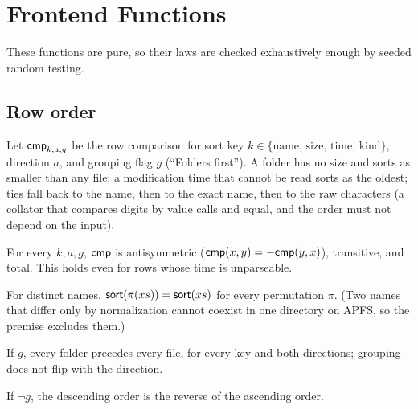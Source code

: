 \section{Frontend Functions}
\label{sec:frontend}

These functions are pure, so their laws are checked exhaustively enough by
seeded random testing.

\subsection{Row order}

Let $\mathsf{cmp}_{k,a,g}$ be the row comparison for sort key $k\in\{\text{name, size,
time, kind}\}$, direction $a$, and grouping flag $g$ (``Folders first'').  A
folder has no size and sorts as smaller than any file; a modification time that
cannot be read sorts as the oldest; ties fall back to the name, then to the
exact name, then to the raw characters (a collator that compares digits by value
calls  and  equal, and the order must not depend on the
input).

\begin{law}
\label{law:total}
For every $k,a,g$, $\mathsf{cmp}$ is antisymmetric
($\mathsf{cmp}(x,y)=-\mathsf{cmp}(y,x)$), transitive, and total.  This holds even for rows whose
time is unparseable.
\end{law}

\begin{law}
\label{law:input-order}
For distinct names, $\mathsf{sort}(\pi(xs))=\mathsf{sort}(xs)$ for every permutation $\pi$.
(Two names that differ only by normalization cannot coexist in one directory on
APFS, so the premise excludes them.)
\end{law}

\begin{law}[Grouping]
\label{law:grouping}
If $g$, every folder precedes every file, for every key and both directions;
grouping does not flip with the direction.
\end{law}

\begin{law}[Reversal]
\label{law:reversal}
If $\neg g$, the descending order is the reverse of the ascending order.
\end{law}

